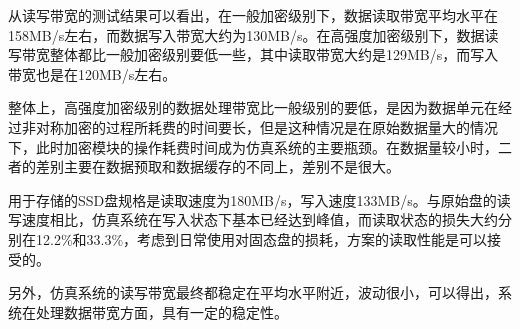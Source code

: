 从读写带宽的测试结果可以看出，在一般加密级别下，数据读取带宽平均水平在158MB/s左右，而数据写入带宽大约为130MB/s。在高强度加密级别下，数据读写带宽整体都比一般加密级别要低一些，其中读取带宽大约是129MB/s，而写入带宽也是在120MB/s左右。


整体上，高强度加密级别的数据处理带宽比一般级别的要低，是因为数据单元在经过非对称加密的过程所耗费的时间要长，但是这种情况是在原始数据量大的情况下，此时加密模块的操作耗费时间成为仿真系统的主要瓶颈。在数据量较小时，二者的差别主要在数据预取和数据缓存的不同上，差别不是很大。


用于存储的SSD盘规格是读取速度为180MB/s，写入速度133MB/s。与原始盘的读写速度相比，仿真系统在写入状态下基本已经达到峰值，而读取状态的损失大约分别在12.2\%和33.3\%，考虑到日常使用对固态盘的损耗，方案的读取性能是可以接受的。


另外，仿真系统的读写带宽最终都稳定在平均水平附近，波动很小，可以得出，系统在处理数据带宽方面，具有一定的稳定性。
